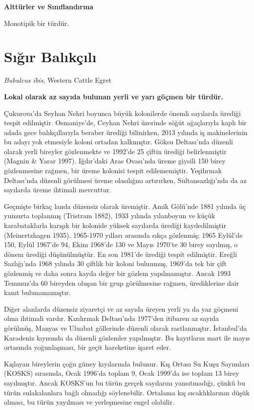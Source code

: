\documentclass[
  letterpaper,
  DIV=11,
  numbers=noendperiod]{scrreprt}
\begin{document}
\textbf{Alttürler ve Sınıflandırma}

Monotipik bir türdür.

\section{Sığır
Balıkçılı}\label{sux131ux11fux131r-balux131kuxe7ux131lux131}

\emph{Bubulcus ibis}, Western Cattle Egret

\textbf{Lokal olarak az sayıda bulunan yerli ve yarı göçmen bir türdür.}

Çukurova'da Seyhan Nehri boyunca büyük kolonilerde önemli sayılarda
ürediği tespit edilmiştir. Osmaniye'de, Ceyhan Nehri üzerinde söğüt
ağaçlarıyla kaplı bir adada gece balıkçıllarıyla beraber ürediği
bilinirken, 2013 yılında iş makinelerinin bu adayı yok etmesiyle koloni
ortadan kalkmıştır. Göksu Deltası'nda düzenli olarak yerli bireyler
gözlenmekte ve 1992'de 25 çiftin ürediği belirlenmiştir (Magnin \& Yarar
1997). Iğdır'daki Aras Ovası'nda üreme giysili 150 birey gözlenmesine
rağmen, bir üreme kolonisi tespit edilememiştir. Yeşilırmak Deltası'nda
düzenli görülmesi üreme olasılığını artırırken, Sultansazlığı'nda da az
sayılarda üreme ihtimali mevcuttur.

Geçmişte birkaç landa düzensiz olarak üremiştir. Amik Gölü'nde 1881
yılında üç yumurta toplanmış (Tristram 1882), 1933 yılında yılanboyun ve
küçük karabataklarla karışık bir kolonide yüksek sayılarda ürediği
kaydedilmiştir (Meinertzhagen 1935). 1965-1970 yılları arasında sıkça
gözlenmiş; 1965 Eylül'de 150, Eylül 1967'de 94, Ekim 1968'de 130 ve
Mayıs 1970'te 30 birey sayılmış, o dönem ürediği düşünülmüştür. En son
1981'de ürediği tespit edilmiştir. Ereğli Sazlığı'nda 1968 yılında 30
çiftlik bir koloni bulunmuş, 1969'da tek bir çift gözlenmiş ve daha
sonra kayda değer bir gözlem yapılmamıştır. Ancak 1993 Temmuz'da 60
bireyden oluşan bir grup görülmesine rağmen, ürediklerine dair kanıt
bulunamamıştır.

Diğer alanlarda düzensiz ziyaretçi ve az sayıda üreyen yerli ya da yaz
göçmeni olma ihtimali vardır. Kızılırmak Deltası'nda 1977'den itibaren
az sayıda görülmüş, Manyas ve Uluabat göllerinde düzenli olarak
rastlanmıştır. İstanbul'da Karadeniz kıyısında da düzenli gözlemler
yapılmıştır. Bu kayıtların mart ile mayıs ortasında yoğunlaşması, bir
geçit hareketine işaret eder.

Kışlayan bireylerin çoğu güney kıyılarında bulunur. Kış Ortası Su Kuşu
Sayımları (KOSKS) sırasında, Ocak 1996'da toplam 9, Ocak 1999'da ise
toplam 13 birey sayılmıştır. Ancak KOSKS'un bu türün gerçek sayılarını
yansıtmadığı, çünkü bu türün sulakalanlara bağlı olmadığı söylenebilir.
Ortalama kış sıcaklıklarının düşük olması, bu türün yayılması ve
yerleşmesine engel olabilir.
\end{document}
